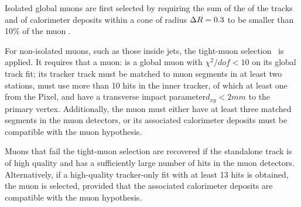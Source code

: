 Isolated global muons are first selected by requiring the
sum of the \pt of the tracks and \ET of calorimeter deposits
within a cone of radius $\Delta R = 0.3$ to be smaller than 10\usep\% of the muon \pt.

For non-isolated muons, such as those inside jets, the tight-muon selection~\cite{CMS-MUO-10-004} is applied.
It requires that a muon:
is a global muon with $\chi^2/dof < 10$ on its global track fit;
its tracker track must be matched to muon segments in at least two stations,
must use more than 10 hits in the inner tracker,
of which at least one from the Pixel,
and have a transverse impact parameter\footnotemark $d_{xy} < 2\unit{mm}$ to the primary vertex.
Additionally, the muon must either have at least three matched segments in the muon detectors,
or its associated calorimeter deposits must be compatible with the muon hypothesis.


Muons that fail the tight-muon selection are recovered if the standalone track is of high quality
and has a sufficiently large number of hits in the muon detectors.
Alternatively, if a high-quality tracker-only fit with at least 13 hits is obtained,
the muon is selected, provided that the associated calorimeter deposits are compatible with the muon hypothesis.
